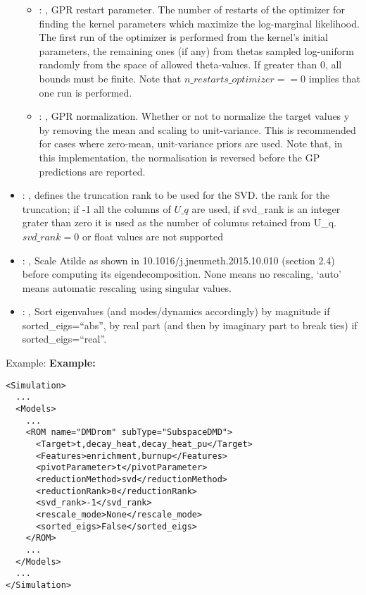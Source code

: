 \begin{itemize}
\begin{itemize}
        \item {}: ,
          GPR restart parameter. The number of restarts of the optimizer for finding the
          kernel parameters which maximize the log-marginal likelihood. The first run of the
          optimizer                                                  is performed from the kernel’s
          initial parameters, the remaining ones (if any) from thetas
          sampled log-uniform randomly from the space of allowed theta-values. If greater than 0,
          all bounds must be finite. Note that $n\_restarts\_optimizer == 0$ implies that one run is
          performed.

        \item {}: ,
          GPR normalization. Whether or not to normalize the target values y by removing the mean
          and scaling                                                  to unit-variance. This is
          recommended for cases where zero-mean, unit-variance priors are used.
          Note that, in this implementation, the normalisation is reversed before the GP predictions
          are reported.
      \end{itemize}

    \item {}: ,
      defines the truncation rank to be used for the SVD.
      the rank for the truncation; if -1 all the columns of $U\_q$ are used,
      if svd\_rank is an integer grater than zero it is used as the number
      of columns retained from U\_q. $svd\_rank=0$ or float values are not supported

    \item {}: ,
      Scale Atilde as shown in 10.1016/j.jneumeth.2015.10.010 (section 2.4) before
      computing its eigendecomposition. None means no rescaling, ‘auto’ means automatic
      rescaling using singular values.

    \item {}: ,
      Sort eigenvalues (and modes/dynamics accordingly) by magnitude if sorted\_eigs=``abs'',
      by real part (and then by imaginary part to break ties) if sorted\_eigs=``real''.
  \end{itemize}

\hspace{24pt}
Example:
\textbf{Example:}
\begin{lstlisting}[style=XML,morekeywords={name,subType}]
<Simulation>
  ...
  <Models>
    ...
    <ROM name="DMDrom" subType="SubspaceDMD">
      <Target>t,decay_heat,decay_heat_pu</Target>
      <Features>enrichment,burnup</Features>
      <pivotParameter>t</pivotParameter>
      <reductionMethod>svd</reductionMethod>
      <reductionRank>0</reductionRank>
      <svd_rank>-1</svd_rank>
      <rescale_mode>None</rescale_mode>
      <sorted_eigs>False</sorted_eigs>
    </ROM>
    ...
  </Models>
  ...
</Simulation>
\end{lstlisting}

